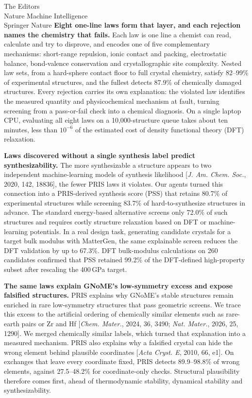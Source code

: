 \documentclass[11pt,a4paper]{letter}
\begin{document}
\begin{letter}{The Editors\\Nature Machine Intelligence\\Springer Nature}
\textbf{Eight one-line laws form that layer, and each rejection names the chemistry that fails.}
Each law is one line a chemist can read, calculate and try to disprove, and encodes one of five complementary mechanisms: short-range repulsion, ionic contact and packing, electrostatic balance, bond-valence conservation and crystallographic site complexity. Nested law sets, from a hard-sphere contact floor to full crystal chemistry, satisfy 82--99\% of experimental structures, and the fullest detects 87.9\% of chemically damaged structures. Every rejection carries its own explanation: the violated law identifies the measured quantity and physicochemical mechanism at fault, turning screening from a pass-or-fail check into a chemical diagnosis. On a single laptop CPU, evaluating all eight laws on a 10{,}000-structure queue takes about ten minutes, less than $10^{-6}$ of the estimated cost of density functional theory (DFT) relaxation.

\textbf{Laws discovered without a single synthesis label predict synthesizability.}
The more synthesizable a structure appears to two independent machine-learning models of synthesis likelihood [\emph{J. Am. Chem. Soc.}, 2020, 142, 18836], the fewer PRIS laws it violates. Our agents turned this connection into a PRIS-derived synthesis score (PSS) that retains 80.7\% of experimental structures while screening 83.7\% of hard-to-synthesize structures in advance. The standard energy-based alternative screens only 72.0\% of such structures and requires costly structure relaxation based on DFT or machine-learning potentials. In a real design task, generating candidate crystals for a target bulk modulus with MatterGen, the same explainable screen reduces the DFT validation by up to 67.3\%. DFT bulk-modulus calculations on 260 candidates confirmed that PSS retained 99.2\% of the DFT-defined high-property subset after rescaling the 400\,GPa target.

\textbf{The same laws explain GNoME's low-symmetry excess and expose falsified structures.} PRIS explains why GNoME's stable structures remain enriched in rare low-symmetry structures that pass geometric screens. We trace this excess to the artificial ordering of chemically similar elements such as rare-earth pairs or Zr and Hf [\emph{Chem. Mater.}, 2024, 36, 3490; \emph{Nat. Mater.}, 2026, 25, 1290]. We merged chemically similar labels, which turned that explanation into a measured mechanism. PRIS also explains why a falsified crystal can hide the wrong element behind plausible coordinates [\emph{Acta Cryst. E}, 2010, 66, e1]. On exchanges that leave every coordinate fixed, PRIS detects 89.9--98.8\% of wrong elements, against 27.5--48.2\% for coordinate-only checks. Structural plausibility therefore comes first, ahead of thermodynamic stability, dynamical stability and synthesizability.


\end{letter}
\end{document}
